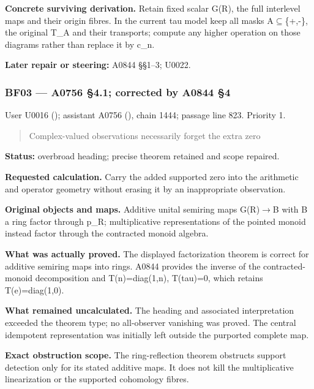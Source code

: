 \textbf{Concrete surviving derivation.} Retain fixed scalar G(R), the
full interlevel maps and their origin fibres. In the current tau model
keep all masks A\allowbreak{}\ensuremath{⊆}\allowbreak{}\{+,-\}, the
original T\_A and their transports; compute any higher operation on
those diagrams rather than replace it by c\_n.

\textbf{Later repair or steering:} A0844 §§1--3; U0022.

\subsubsection{BF03 --- A0756 §4.1; corrected by A0844
§4}\label{TranscriptLedgerStage:bf03-a0756-4.1-corrected-by-a0844-4}

User U0016 (\protect{});
assistant A0756 (\protect{}),
chain 1444; passage line 823. Priority 1.

\begin{quote}
Complex-valued observations necessarily forget the extra zero
\end{quote}

\textbf{Status:} overbroad heading; precise theorem retained and scope
repaired.

\textbf{Requested calculation.} Carry the added supported zero into the
arithmetic and operator geometry without erasing it by an inappropriate
observation.

\textbf{Original objects and maps.} Additive unital semiring maps
G(R)\allowbreak{}\ensuremath{→}\allowbreak{}B with B a ring factor
through p\_R; multiplicative representations of the pointed monoid
instead factor through the contracted monoid algebra.

\textbf{What was actually proved.} The displayed factorization theorem
is correct for additive semiring maps into rings. A0844 provides the
inverse of the contracted-monoid decomposition and T(n)=diag(1,n),
T(tau)=0, which retains T(e)=diag(1,0).

\textbf{What remained uncalculated.} The heading and associated
interpretation exceeded the theorem type; no all-observer vanishing was
proved. The central idempotent representation was initially left outside
the purported complete map.

\textbf{Exact obstruction scope.} The ring-reflection theorem obstructs
support detection only for its stated additive maps. It does not kill
the multiplicative linearization or the supported cohomology fibres.

